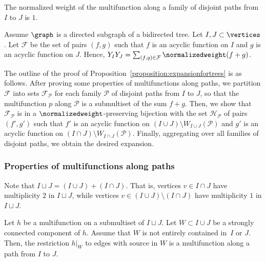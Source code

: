 \begin{prop} \label{proposition:alongpath:normalizedweight}
    The normalized weight of the multifunction along a family of disjoint paths from \(I\) to \(J\) is \(1\).
\end{prop}


Assume \(\graph\) is a directed subgraph of a bidirected tree.
Let \(I, J \subset \vertices\).
Let \(\mathcal{F}\) be the set of pairs \((f, g)\) such that \(f\) is an acyclic function on \(I\) and \(g\) is an acyclic function on \(J\).
Hence, \(Y_I Y_J = \sum_{(f, g) \in \mathcal{F}} \normalizedweight(f + g)\).

The outline of the proof of Proposition~\ref{proposition:expansionfortrees} is as follows.
After proving some properties of multifunctions along paths,
we partition \(\mathcal{F}\) into sets \(\mathcal{F}_{\mathcal{P}}\) for each family \(\mathcal{P}\) of disjoint paths from \(I\) to \(J\),
so that the multifunction \(p\) along \(\mathcal{P}\) is a submultiset of the sum \(f + g\).
Then, we show that \(\mathcal{F}_{\mathcal{P}}\) is in a \(\normalizedweight\)-preserving bijection with the set \(\mathcal{H}_{\mathcal{P}}\) of pairs \((f', g')\) such that \(f'\) is an acyclic function on \((I \cup J) \setminus W_{I \cup J}(\mathcal{P})\) and \(g'\) is an acyclic function on \((I \cap J) \setminus W_{I \cap J}(\mathcal{P})\).
Finally, aggregating over all families of disjoint paths, we obtain the desired expansion.


\subsubsection{Properties of multifunctions along paths}

Note that \(I \sqcup J = (I \cup J) + (I \cap J)\).
That is, vertices \(v \in I \cap J\) have multiplicity \(2\) in \(I \sqcup J\),
while vertices \(v \in (I \cup J) \setminus (I \cap J)\) have multiplicity \(1\) in \(I \sqcup J\).

\begin{prop} \label{proposition:restriction-strongly-connected}
    Let \(h\) be a multifunction on a submultiset of \(I \sqcup J\).
    Let \(W \subset I \cup J\) be a strongly connected component of \(h\).
    Assume that \(W\) is not entirely contained in~\(I\) or \(J\).
    Then, the restriction \(h|_W\) to edges with source in \(W\)
     is a multifunction along a path from \(I\) to \(J\).
\end{prop}

